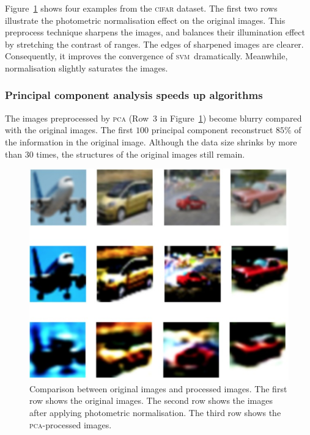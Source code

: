 \documentclass[12pt]{article} %
\newcommand{\svm}{\textsc{svm}}
\begin{document}
Figure~\ref{fig:Compare_Image} shows four examples from the 
\textsc{cifar} dataset. The first two rows illustrate the photometric normalisation effect on the original images. This preprocess technique sharpens the images, and balances their illumination effect by stretching the contrast of ranges. 
The edges of sharpened images are clearer.
Consequently, it improves the convergence of \svm\ dramatically. Meanwhile, normalisation slightly saturates the images.    

\subsubsection{Principal component analysis  speeds up algorithms}

The images preprocessed by \textsc{pca}  (Row~3 in Figure~\ref{fig:Compare_Image}) become blurry compared with the original images. The first $100$ principal component reconstruct $85\%$ of the information in the original image. Although the data size shrinks by more than $30$ times, the structures of the original images still remain.
\begin{figure} 
    \centering
	\includegraphics[scale=0.6]{img}
	\caption{Comparison between original images and processed images. The first row shows the original images. The second row shows the images after applying photometric normalisation. The third row shows the \textsc{pca}-processed images.}
	\label{fig:Compare_Image}
\end{figure}
\end{document}
